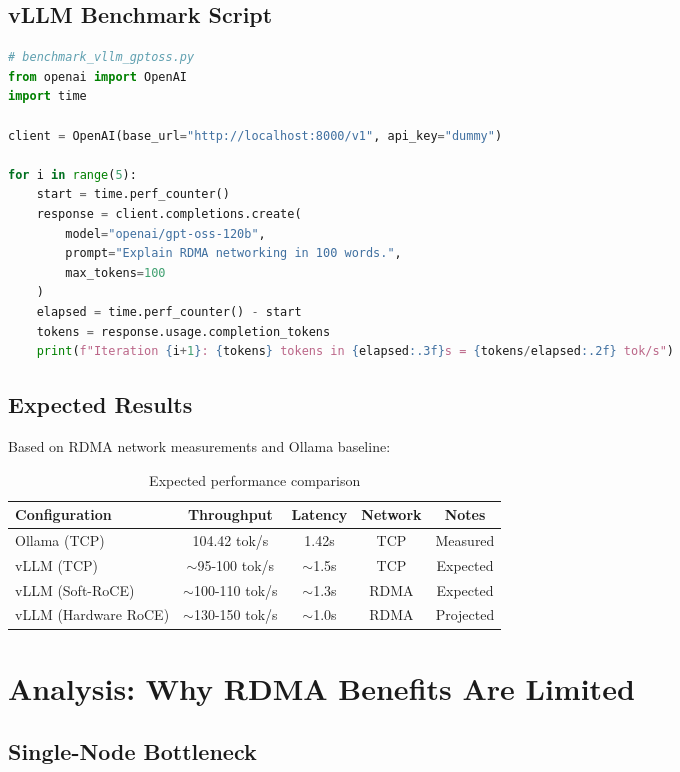 \documentclass[10pt,letterpaper]{article}
\begin{document}
\subsection{vLLM Benchmark Script}

\begin{lstlisting}[language=python]
# benchmark_vllm_gptoss.py
from openai import OpenAI
import time

client = OpenAI(base_url="http://localhost:8000/v1", api_key="dummy")

for i in range(5):
    start = time.perf_counter()
    response = client.completions.create(
        model="openai/gpt-oss-120b",
        prompt="Explain RDMA networking in 100 words.",
        max_tokens=100
    )
    elapsed = time.perf_counter() - start
    tokens = response.usage.completion_tokens
    print(f"Iteration {i+1}: {tokens} tokens in {elapsed:.3f}s = {tokens/elapsed:.2f} tok/s")
\end{lstlisting}

\subsection{Expected Results}

Based on RDMA network measurements and Ollama baseline:

\begin{table}[H]
\centering
\small
\begin{tabular}{@{}lcccc@{}}
\toprule
\textbf{Configuration} & \textbf{Throughput} & \textbf{Latency} & \textbf{Network} & \textbf{Notes} \\
\midrule
Ollama (TCP) & 104.42 tok/s & 1.42s & TCP & Measured \\
vLLM (TCP) & $\sim$95-100 tok/s & $\sim$1.5s & TCP & Expected \\
vLLM (Soft-RoCE) & $\sim$100-110 tok/s & $\sim$1.3s & RDMA & Expected \\
vLLM (Hardware RoCE) & $\sim$130-150 tok/s & $\sim$1.0s & RDMA & Projected \\
\bottomrule
\end{tabular}
\caption{Expected performance comparison}
\end{table}

\section{Analysis: Why RDMA Benefits Are Limited}

\subsection{Single-Node Bottleneck}
\end{document}

